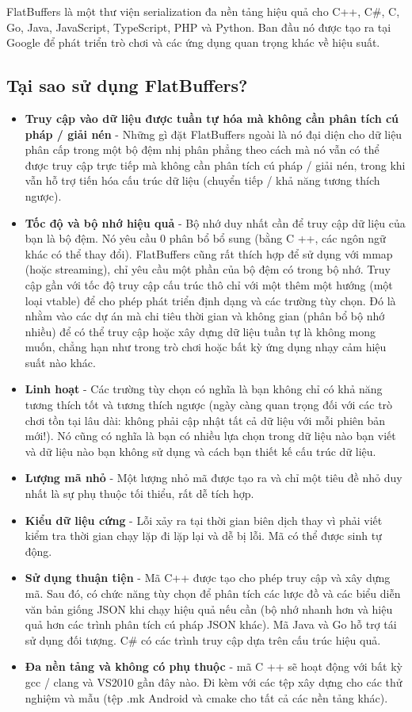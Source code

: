 FlatBuffers là một thư viện serialization đa nền tảng hiệu quả cho C++, C\#, C, Go, Java, JavaScript, TypeScript, PHP và Python. 
Ban đầu nó được tạo ra tại Google để phát triển trò chơi và các ứng dụng quan trọng khác về hiệu suất.
\subsection{Tại sao sử dụng FlatBuffers?}
\begin{itemize}
\item \textbf{Truy cập vào dữ liệu được tuần tự hóa mà không cần phân tích cú pháp / giải nén} - Những gì đặt FlatBuffers ngoài là nó đại diện cho dữ liệu phân cấp trong một bộ đệm nhị phân phẳng theo cách mà nó vẫn có thể được truy cập trực tiếp mà không cần phân tích cú pháp / giải nén, trong khi vẫn hỗ trợ tiến hóa cấu trúc dữ liệu (chuyển tiếp / khả năng tương thích ngược).
\item \textbf{Tốc độ và bộ nhớ hiệu quả} - Bộ nhớ duy nhất cần để truy cập dữ liệu của bạn là bộ đệm. Nó yêu cầu 0 phân bổ bổ sung (bằng C ++, các ngôn ngữ khác có thể thay đổi). FlatBuffers cũng rất thích hợp để sử dụng với mmap (hoặc streaming), chỉ yêu cầu một phần của bộ đệm có trong bộ nhớ. Truy cập gần với tốc độ truy cập cấu trúc thô chỉ với một thêm một hướng (một loại vtable) để cho phép phát triển định dạng và các trường tùy chọn. Đó là nhằm vào các dự án mà chi tiêu thời gian và không gian (phân bổ bộ nhớ nhiều) để có thể truy cập hoặc xây dựng dữ liệu tuần tự là không mong muốn, chẳng hạn như trong trò chơi hoặc bất kỳ ứng dụng nhạy cảm hiệu suất nào khác.
\item \textbf{Linh hoạt} - Các trường tùy chọn có nghĩa là bạn không chỉ có khả năng tương thích tốt và tương thích ngược (ngày càng quan trọng đối với các trò chơi tồn tại lâu dài: không phải cập nhật tất cả dữ liệu với mỗi phiên bản mới!). Nó cũng có nghĩa là bạn có nhiều lựa chọn trong dữ liệu nào bạn viết và dữ liệu nào bạn không sử dụng và cách bạn thiết kế cấu trúc dữ liệu.
\item \textbf{Lượng mã nhỏ} - Một lượng nhỏ mã được tạo ra và chỉ một tiêu đề nhỏ duy nhất là sự phụ thuộc tối thiểu, rất dễ tích hợp.
\item \textbf{Kiểu dữ liệu cứng} - Lỗi xảy ra tại thời gian biên dịch thay vì phải viết kiểm tra thời gian chạy lặp đi lặp lại và dễ bị lỗi. Mã có thể được sinh tự động.
\item \textbf{Sử dụng thuận tiện} - Mã C++ được tạo cho phép truy cập và xây dựng mã. Sau đó, có chức năng tùy chọn để phân tích các lược đồ và các biểu diễn văn bản giống JSON khi chạy hiệu quả nếu cần (bộ nhớ nhanh hơn và hiệu quả hơn các trình phân tích cú pháp JSON khác).
\newline 
Mã Java và Go hỗ trợ tái sử dụng đối tượng. C\# có các trình truy cập dựa trên cấu trúc hiệu quả.
\item \textbf{Đa nền tảng và không có phụ thuộc} - mã C ++ sẽ hoạt động với bất kỳ gcc / clang và VS2010 gần đây nào. Đi kèm với các tệp xây dựng cho các thử nghiệm và mẫu (tệp .mk Android và cmake cho tất cả các nền tảng khác).
\end{itemize}